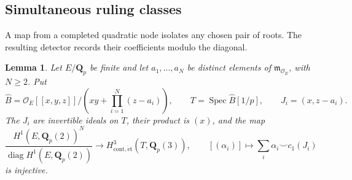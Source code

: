 \documentclass[11pt,a4paper]{amsart}
\numberwithin{equation}{section}
\newtheorem{lemma}[theorem]{Lemma}
\theoremstyle{definition}
\theoremstyle{remark}
\newcommand{\Q}{\mathbf Q}
\newcommand{\OO}{\mathcal O}
\newcommand{\Spec}{\operatorname{Spec}}
\begin{document}
\subsection{Simultaneous ruling classes}
A map from a completed quadratic node isolates any chosen pair of roots.
The resulting detector records their coefficients modulo the diagonal.

\begin{lemma}\label{d3:lem:completedrootcup}\label{d3:lem:completedtamecup}
Let $E/\Q_p$ be finite and let $a_1,\ldots,a_N$ be distinct elements of $\mathfrak m_{\OO_E}$, with $N\geq2$. Put
\[
\widehat B=\OO_E[[x,y,z]]/
\left(xy+\prod_{i=1}^N(z-a_i)\right),
\qquad T=\Spec\widehat B[1/p],
\qquad J_i=(x,z-a_i).
\]
The $J_i$ are invertible ideals on $T$, their product is $(x)$, and the map
\begin{equation}\label{d3:eq:completedtamecup}
\frac{H^1(E,\Q_p(2))^N}
{\operatorname{diag}H^1(E,\Q_p(2))}
\longrightarrow H^3_{\mathrm{cont},\mathrm{\acute et}}(T,\Q_p(3)),
\qquad
[(\alpha_i)]\longmapsto\sum_i\alpha_i\smile c_1(J_i)
\end{equation}
is injective.
\end{lemma}
\end{document}
